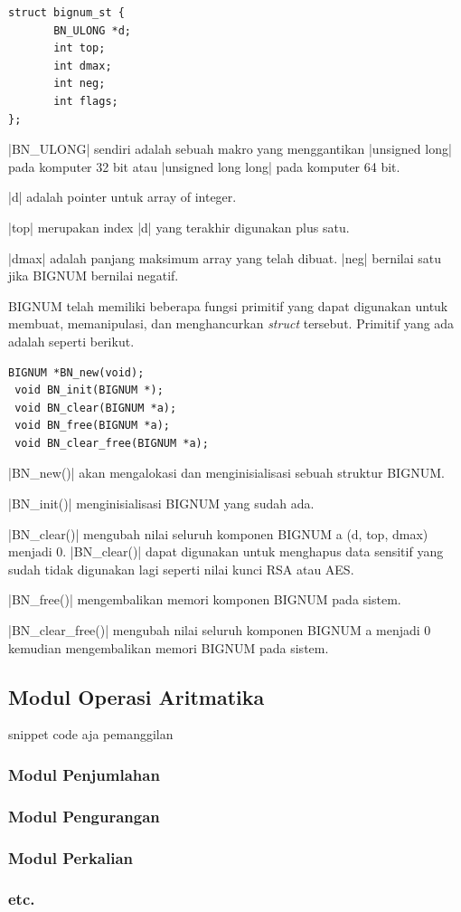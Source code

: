 \begin{lstlisting}[style = code]
struct bignum_st {
       BN_ULONG *d;
       int top;
       int dmax;
       int neg;
       int flags;
};
\end{lstlisting}

|BN_ULONG| sendiri adalah sebuah makro yang menggantikan |unsigned long| pada komputer 32 bit atau |unsigned long long| pada komputer 64 bit.

|d| adalah pointer untuk array of integer.

|top| merupakan index |d| yang terakhir digunakan plus satu.

|dmax| adalah panjang maksimum array yang telah dibuat. |neg| bernilai satu jika BIGNUM bernilai negatif.

BIGNUM telah memiliki beberapa fungsi primitif yang dapat digunakan untuk membuat, memanipulasi, dan menghancurkan \textit{struct} tersebut. Primitif yang ada adalah seperti berikut.

\begin{lstlisting}[caption=Primitif BIGNUM]
 BIGNUM *BN_new(void);
 void BN_init(BIGNUM *);
 void BN_clear(BIGNUM *a);
 void BN_free(BIGNUM *a);
 void BN_clear_free(BIGNUM *a);
\end{lstlisting}

|BN_new()| akan mengalokasi dan menginisialisasi sebuah struktur BIGNUM.

|BN_init()| menginisialisasi BIGNUM yang sudah ada.

|BN_clear()| mengubah nilai seluruh komponen BIGNUM a (d, top, dmax) menjadi 0. |BN_clear()| dapat digunakan untuk menghapus data sensitif yang sudah tidak digunakan lagi seperti nilai kunci RSA atau AES.

|BN_free()| mengembalikan memori komponen BIGNUM pada sistem.

|BN_clear_free()| mengubah nilai seluruh komponen BIGNUM a menjadi 0 kemudian mengembalikan memori BIGNUM pada sistem.


\subsection{Modul Operasi Aritmatika}
snippet code aja pemanggilan
\subsubsection{Modul Penjumlahan}
\subsubsection{Modul Pengurangan}
\subsubsection{Modul Perkalian}
\subsubsection{etc.}
